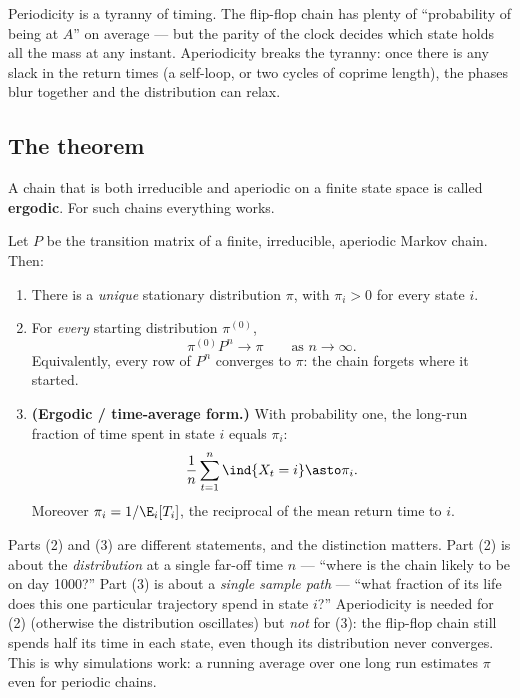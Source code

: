 \begin{intuitionbox}
Periodicity is a tyranny of timing. The flip-flop chain has plenty of
``probability of being at $A$'' on average --- but the parity of the clock decides
which state holds all the mass at any instant. Aperiodicity breaks the tyranny:
once there is any slack in the return times (a self-loop, or two cycles of
coprime length), the phases blur together and the distribution can relax.
\end{intuitionbox}

\subsection{The theorem}

A chain that is both irreducible and aperiodic on a finite state space is called
\textbf{ergodic}. For such chains everything works.

\begin{theorem}
\label{ch24:thm-convergence}
Let $P$ be the transition matrix of a finite, irreducible, aperiodic Markov chain.
Then:
\begin{enumerate}
  \item There is a \emph{unique} stationary distribution $\pi$, with $\pi_i > 0$
    for every state $i$.
  \item For \emph{every} starting distribution $\pi^{(0)}$,
    \[
      \pi^{(0)} P^n \longrightarrow \pi \qquad \text{as } n\to\infty .
    \]
    Equivalently, every row of $P^n$ converges to $\pi$: the chain forgets where
    it started.
  \item \textbf{(Ergodic / time-average form.)} With probability one, the
    long-run fraction of time spent in state $i$ equals $\pi_i$:
    \[
      \frac{1}{n}\sum_{t=1}^{n} \ind\{X_t = i\} \asto \pi_i .
    \]
    Moreover $\pi_i = 1/\E_i[T_i]$, the reciprocal of the mean return
    time to $i$.
\end{enumerate}
\end{theorem}

Parts (2) and (3) are different statements, and the distinction matters. Part (2)
is about the \emph{distribution} at a single far-off time $n$ --- ``where is the
chain likely to be on day 1000?'' Part (3) is about a \emph{single sample path}
--- ``what fraction of its life does this one particular trajectory spend in state
$i$?'' Aperiodicity is needed for (2) (otherwise the distribution oscillates) but
\emph{not} for (3): the flip-flop chain still spends half its time in each state,
even though its distribution never converges. This is why simulations work: a
running average over one long run estimates $\pi$ even for periodic chains.

